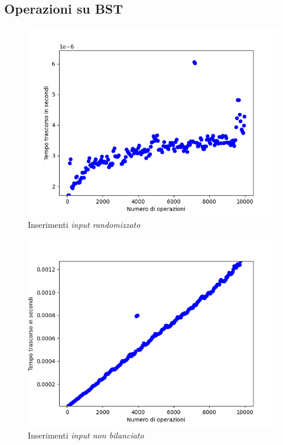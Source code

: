\documentclass{article}
\begin{document}
		\newpage
		\subsection{Operazioni su BST}
		
			\begin{figure}[h!]
				\centering
				\includegraphics[scale = 0.8]{BST_Insertions}
				\caption{Inserimenti \textit{input randomizzato}}
			\end{figure}
			\begin{figure}[h!]
				\centering
				\includegraphics[scale = 0.8]{BST_Unbalanced_Insertions}
				\caption{Inserimenti \textit{input non bilanciato}}
			\end{figure}
\end{document}
